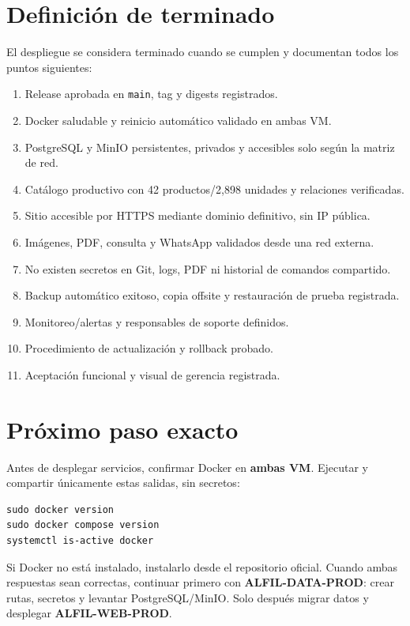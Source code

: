 \documentclass[11pt,a4paper]{article}
\newcommand{\code}[1]{\nolinkurl{#1}}
\begin{document}
\section{Definición de terminado}

El despliegue se considera terminado cuando se cumplen y documentan todos los puntos siguientes:

\begin{enumerate}
  \item Release aprobada en \code{main}, tag y digests registrados.
  \item Docker saludable y reinicio automático validado en ambas VM.
  \item PostgreSQL y MinIO persistentes, privados y accesibles solo según la matriz de red.
  \item Catálogo productivo con 42 productos/2,898 unidades y relaciones verificadas.
  \item Sitio accesible por HTTPS mediante dominio definitivo, sin IP pública.
  \item Imágenes, PDF, consulta y WhatsApp validados desde una red externa.
  \item No existen secretos en Git, logs, PDF ni historial de comandos compartido.
  \item Backup automático exitoso, copia offsite y restauración de prueba registrada.
  \item Monitoreo/alertas y responsables de soporte definidos.
  \item Procedimiento de actualización y rollback probado.
  \item Aceptación funcional y visual de gerencia registrada.
\end{enumerate}

\section{Próximo paso exacto}

Antes de desplegar servicios, confirmar Docker en \textbf{ambas VM}. Ejecutar y compartir únicamente estas salidas, sin secretos:

\begin{lstlisting}
sudo docker version
sudo docker compose version
systemctl is-active docker
\end{lstlisting}

Si Docker no está instalado, instalarlo desde el repositorio oficial. Cuando ambas respuestas sean correctas, continuar primero con \textbf{ALFIL-DATA-PROD}: crear rutas, secretos y levantar PostgreSQL/MinIO. Solo después migrar datos y desplegar \textbf{ALFIL-WEB-PROD}.
\end{document}
